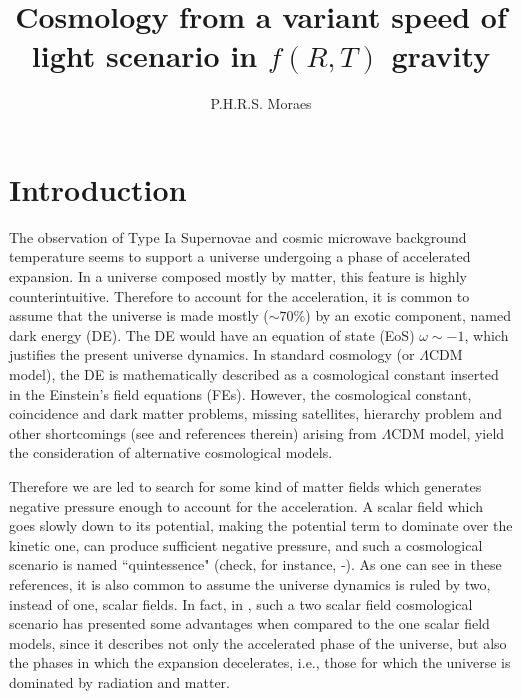 \documentclass[aps,twocolumn,showpacs]{revtex4}
\begin{document}
\title{Cosmology from a variant speed of light scenario in $f(R,T)$ gravity}
\author{P.H.R.S. Moraes}

\begin{abstract}

\end{abstract}

\pacs{}

\maketitle

\section{Introduction}\label{sec:int}

The observation of Type Ia Supernovae \cite{riess/1998,perlmutter/1999} and cosmic microwave background temperature \cite{hinshaw/2013} seems to support a universe undergoing a phase of accelerated expansion. In a universe composed mostly by matter, this feature is highly counterintuitive. Therefore to account for the acceleration, it is common to assume that the universe is made mostly ($\sim70\%$) by an exotic component, named dark energy (DE). The DE would have an equation of state (EoS) $\omega\sim-1$, which justifies the present universe dynamics. In standard cosmology (or $\Lambda$CDM model), the DE is mathematically described as a cosmological constant inserted in the Einstein's field equations (FEs). However, the cosmological constant, coincidence and dark matter problems, missing satellites, hierarchy problem and other shortcomings (see \cite{clifton/2012} and references therein) arising from $\Lambda$CDM model, yield the consideration of alternative cosmological models.

Therefore we are led to search for some kind of matter fields which generates negative pressure enough to account for the acceleration. A scalar field which goes slowly down to its potential, making the potential term to dominate over the kinetic one, can produce sufficient negative pressure, and such a cosmological scenario is named ``quintessence" (check, for instance, \cite{cds}-\cite{ms/2014}). As one can see in these references, it is also common to assume the universe dynamics is ruled by two, instead of one, scalar fields. In fact, in \cite{ms/2014}, such a two scalar field cosmological scenario has presented some advantages when compared to the one scalar field models, since it describes not only the accelerated phase of the universe, but also the phases in which the expansion decelerates, i.e., those for which the universe is dominated by radiation and matter.
\end{document}
